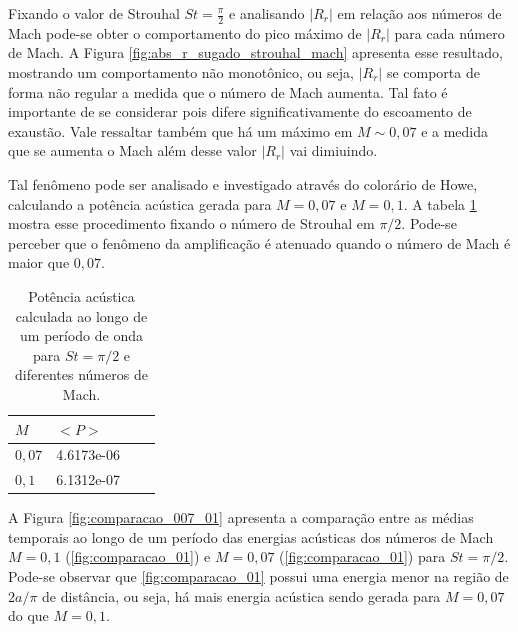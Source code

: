 Fixando o valor de Strouhal $St = \frac{\pi}{2}$ e analisando $|R_{r}|$ em relação aos números de Mach pode-se obter o comportamento do pico máximo de $|R_{r}|$ para cada número de Mach. A Figura \ref{fig:abs_r_sugado_strouhal_mach} apresenta esse resultado, mostrando um comportamento não monotônico, ou seja, $|R_{r}|$ se comporta de forma não regular a medida que o número de Mach aumenta. Tal fato é importante de se considerar pois difere significativamente do escoamento de exaustão. Vale ressaltar também que há um máximo em $M \sim 0,07$ e a medida que se aumenta o Mach além desse valor $|R_{r}|$ vai dimiuindo.

Tal fenômeno pode ser analisado e investigado através do colorário de Howe, calculando a potência acústica gerada para $M = 0,07$ e $M = 0,1$. A tabela \ref{table:potencia_mach} mostra esse procedimento fixando o número de Strouhal em $\pi/2$. Pode-se perceber que o fenômeno da amplificação é atenuado quando o número de Mach é maior que $0,07$.    

\begin{table}[ht!]
\centering
\caption{Potência acústica calculada ao longo de um período de onda para $St = \pi/2$ e diferentes números de Mach.}
\label{table:potencia_mach}
    \begin{tabular}{|l|l|l|l|}
        \hline
        $M$ & $<P>$ \\ \hline
        $0,07$ & 4.6173e-06  \\ \hline  
        $0,1$ & 6.1312e-07 \\ \hline
    \end{tabular}
\end{table}

\newpage

A Figura \ref{fig:comparacao_007_01} apresenta a comparação entre as médias temporais ao longo de um período das energias acústicas dos números de Mach $M = 0,1$ (\ref{fig:comparacao_01}) e $M = 0,07$ (\ref{fig:comparacao_01}) para $St = \pi/2$. Pode-se observar que \ref{fig:comparacao_01} possui uma energia menor na região de $2a/\pi$ de distância, ou seja, há mais energia acústica sendo gerada para $M = 0,07$ do que $M = 0,1$.    


